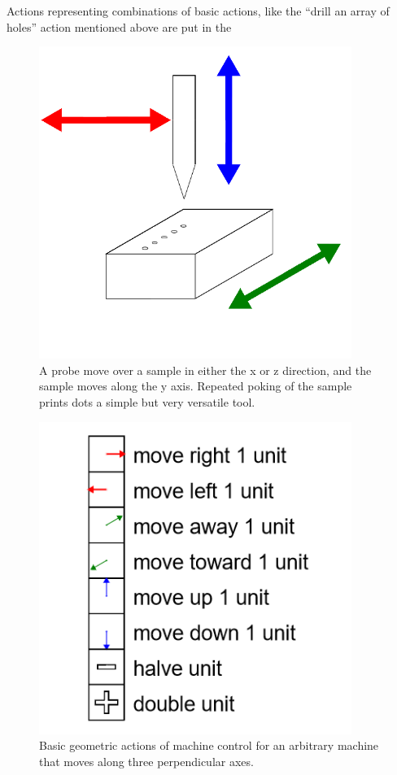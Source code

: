 Actions representing combinations of basic actions, like the ``drill an array of holes'' action mentioned above are put in the 

\begin{figure}
	\centering
	\includegraphics[width=4in]{figures/machines/xyzprobe.png}
	\caption[xyzprobe]
	{A probe move over a sample in either the x or z direction, and the sample moves along the y axis.  Repeated poking of the sample prints dots a simple but very versatile tool.}
\end{figure}


\begin{figure}
	\centering
	\includegraphics[width=4in]{figures/machines/basicmovements.png}
	\caption[basicmovements]
	{Basic geometric actions of machine control for an arbitrary machine that moves along three perpendicular axes.}
\end{figure}



